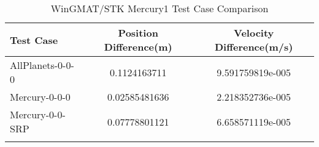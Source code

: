 \begin{table}[htbp!]
\centering
\caption{ WinGMAT/STK Mercury1 Test Case Comparison}
      \begin{tabular}{lcc}
      \hline\hline
          Test Case & Position Difference(m) & Velocity Difference(m/s) \\
         \hline
         AllPlanets-0-0-0 & 0.1124163711 & 9.591759819e-005 \\
         Mercury-0-0-0 & 0.02585481636 & 2.218352736e-005 \\
         Mercury-0-0-SRP & 0.07778801121 & 6.658571119e-005 \\
      \hline\hline
      \label{Table: Mercury1 WinGMAT-STK Table} 
\end{tabular}
\end{table}
